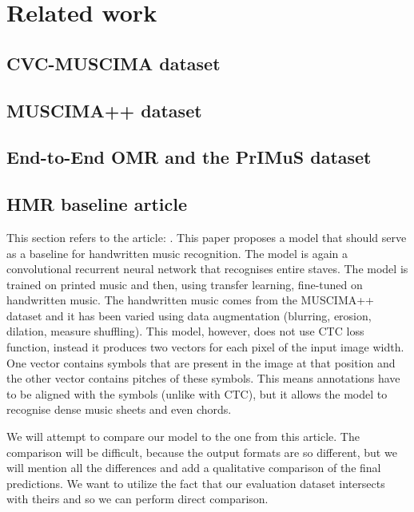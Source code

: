 \chapter*{Related work}

\section*{CVC-MUSCIMA dataset}

\section*{MUSCIMA++ dataset}

\section*{End-to-End OMR and the PrIMuS dataset}

\section*{HMR baseline article}

This section refers to the article: \cite{BARO20191}. This paper proposes a model that should serve as a baseline for handwritten music recognition. The model is again a convolutional recurrent neural network that recognises entire staves. The model is trained on printed music and then, using transfer learning, fine-tuned on handwritten music. The handwritten music comes from the MUSCIMA++ dataset and it has been varied using data augmentation (blurring, erosion, dilation, measure shuffling). This model, however, does not use CTC loss function, instead it produces two vectors for each pixel of the input image width. One vector contains symbols that are present in the image at that position and the other vector contains pitches of these symbols. This means annotations have to be aligned with the symbols (unlike with CTC), but it allows the model to recognise dense music sheets and even chords.

We will attempt to compare our model to the one from this article. The comparison will be difficult, because the output formats are so different, but we will mention all the differences and add a qualitative comparison of the final predictions. We want to utilize the fact that our evaluation dataset intersects with theirs and so we can perform direct comparison.
